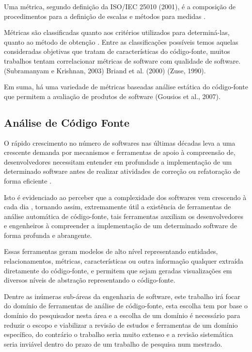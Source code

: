 \documentclass[qual, classic, a4paper]{ufbathesis}
\begin{document}
Uma métrica, segundo definição da ISO/IEC 25010 (2001), é a composição de
procedimentos para a definição de escalas e métodos para medidas
\cite{Meirelles2013}.

Métricas são classificadas quanto aos critérios utilizados para determiná-las,
quanto ao método de obtenção \cite{Meirelles2013}. Entre as classificações
possíveis temos aquelas consideradas objetivas que tratam de características
do código-fonte, muitos trabalhos tentam correlacionar métricas de software
com qualidade de software.  (Subramanyam e Krishnan, 2003) Briand et al.
(2000) (Zuse, 1990).

Em suma, há uma variedade de métricas baseadas análise estática do código-fonte que permitem
a avaliação de produtos de software (Gousios et al., 2007).


\subsection{Análise de Código Fonte}

O rápido crescimento no número de softwares nas últimas décadas leva a uma
crescente demanda por mecanismos e ferramentas de apoio à compreensão de,
desenvolvedores necessitam entender em profundade a implementação de um
determinado software antes de realizar atividades de correção ou refatoração
de forma eficiente \cite{Kirkov2010}.

Isto é evidenciado ao perceber que a complexidade dos softwares vem crescendo
à cada dia \cite{Kirkov2010}, tornando assim, extremamente útil a existência
de ferramentas de análise automática de código-fonte, tais ferramentas
auxiliam os desenvolvedores e engenheiros à compreender a implementação de um
determinado software de forma profunda e abrangente.

Essas ferramentas geram modelos de alto nível representando entidades,
relacionamentos, métricas, características ou outra informação qualquer
extraída diretamente do código-fonte, e permitem que sejam geradas
visualizações em diversos níveis de abstração representando o código-fonte.

Dentre as inúmeras sub-áreas da engenharia de software, este trabalho irá
focar do domínio de ferramentas de análise de código-fonte, esta escolha tem
por base o domínio do pesquisador nesta área e a escolha de um domínio é
necessário para reduzir o escopo e viabilizar a revisão de estudos e
ferramentas de um domínio específico, do contrário o trabalho seria muito
extenso e a revisão sistemática seria inviável dentro do prazo de um trabalho
de pesquisa num mestrado.
\end{document}

